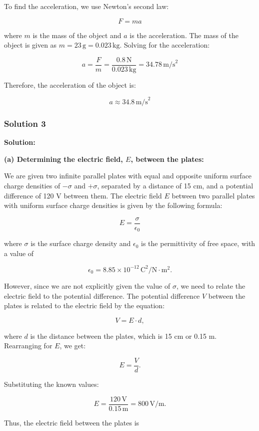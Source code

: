 \documentclass{article}
\begin{document}
\begin{enumerate}
    To find the acceleration, we use Newton’s second law:

    \[
    F = ma
    \]

    where $m$ is the mass of the object and $a$ is the acceleration. The mass of the object is given as $m = 23 \, \text{g} = 0.023 \, \text{kg}$. Solving for the acceleration:

    \[
    a = \frac{F}{m} = \frac{0.8 \, \text{N}}{0.023 \, \text{kg}} = 34.78 \, \text{m/s}^2
    \]

    Therefore, the acceleration of the object is:

    \[
    a \approx 34.8 \, \text{m/s}^2
    \]
\end{enumerate}

\subsubsection{Solution 3}
\textbf{Solution:}

\textbf{(a) Determining the electric field, $E$, between the plates:}

We are given two infinite parallel plates with equal and opposite uniform surface charge densities of $-\sigma$ and $+\sigma$, separated by a distance of 15 cm, and a potential difference of 120 V between them. The electric field $E$ between two parallel plates with uniform surface charge densities is given by the following formula:

\[
E = \frac{\sigma}{\epsilon_0}
\]

where $\sigma$ is the surface charge density and $\epsilon_0$ is the permittivity of free space, with a value of

\[
\epsilon_0 = 8.85 \times 10^{-12} \, \text{C}^2/\text{N}\cdot\text{m}^2.
\]

However, since we are not explicitly given the value of $\sigma$, we need to relate the electric field to the potential difference. The potential difference $V$ between the plates is related to the electric field by the equation:

\[
V = E \cdot d,
\]

where $d$ is the distance between the plates, which is 15 cm or 0.15 m. Rearranging for $E$, we get:

\[
E = \frac{V}{d}.
\]

Substituting the known values:

\[
E = \frac{120 \, \text{V}}{0.15 \, \text{m}} = 800 \, \text{V/m}.
\]

Thus, the electric field between the plates is
\end{document}
